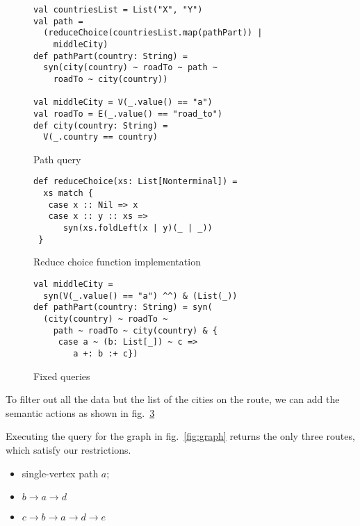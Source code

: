 \begin{figure}[h]
\begin{lstlisting}
val countriesList = List("X", "Y")
val path =
  (reduceChoice(countriesList.map(pathPart)) |
    middleCity)
def pathPart(country: String) =
  syn(city(country) ~ roadTo ~ path ~
    roadTo ~ city(country))

val middleCity = V(_.value() == "a")
val roadTo = E(_.value() == "road_to")
def city(country: String) =
  V(_.country == country)
\end{lstlisting}
\caption{Path query}
\label{fig:pathQuery}
\end{figure}

\begin{figure}[h]
\begin{lstlisting}
def reduceChoice(xs: List[Nonterminal]) =
  xs match {
   case x :: Nil => x
   case x :: y :: xs =>
      syn(xs.foldLeft(x | y)(_ | _))
 }
\end{lstlisting}
\caption{Reduce choice function implementation}
\label{fig:reduceChoice}
\end{figure}

\begin{figure}[h]
\begin{lstlisting}
val middleCity =
  syn(V(_.value() == "a") ^^) & (List(_))
def pathPart(country: String) = syn(
  (city(country) ~ roadTo ~
    path ~ roadTo ~ city(country) & {
     case a ~ (b: List[_]) ~ c =>
        a +: b :+ c})
\end{lstlisting}
\caption{Fixed queries}
\label{fig:fixedPathQ}
\end{figure}

To filter out all the data but the list of the cities on the route, we can add the semantic actions as shown in fig.~\ref{fig:fixedPathQ}


Executing the query for the graph in fig.~\ref{fig:graph} returns the only three routes, which satisfy our restrictions. 

\begin{itemize}
\item single-vertex path $a$;
\item $b \rightarrow a \rightarrow d$
\item $c \rightarrow b \rightarrow a \rightarrow d \rightarrow e$
\end{itemize}


